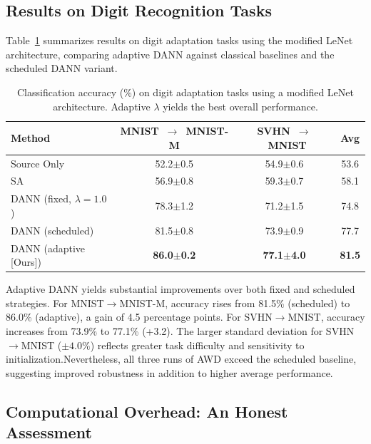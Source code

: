 \documentclass[pdflatex,sn-mathphys-num]{sn-jnl}
\theoremstyle{thmstyleone}
\theoremstyle{thmstyletwo}
\theoremstyle{thmstylethree}
\begin{document}
\subsection{Results on Digit Recognition Tasks}

Table~\ref{tab:digits} summarizes results on digit adaptation tasks using the modified LeNet architecture, comparing adaptive DANN against classical baselines and the scheduled DANN variant.

\begin{table}[t]
    \centering
    \footnotesize 
    \setlength{\tabcolsep}{3.5pt} 
    \caption{Classification accuracy (\%) on digit adaptation tasks using a modified LeNet architecture. Adaptive $\lambda$ yields the best overall performance.}
    \label{tab:digits}
    \begin{tabular}{lccc}
        \toprule
        Method & MNIST~$\to$~MNIST-M & SVHN~$\to$~MNIST & Avg \\
        \midrule
        Source Only & 52.2$\pm$0.5 & 54.9$\pm$0.6 & 53.6 \\
        SA~\cite{fernando2013sa} & 56.9$\pm$0.8 & 59.3$\pm$0.7 & 58.1 \\
        \midrule
        DANN (fixed, $\lambda=1.0$) & 78.3$\pm$1.2 & 71.2$\pm$1.5 & 74.8 \\
        DANN (scheduled)~\cite{ganin2016dann} & 81.5$\pm$0.8 & 73.9$\pm$0.9 & 77.7 \\
        DANN (adaptive [Ours]) & \textbf{86.0$\pm$0.2} & \textbf{77.1$\pm$4.0} & \textbf{81.5} \\
        \bottomrule
    \end{tabular}
\end{table}

Adaptive DANN yields substantial improvements over both fixed and scheduled strategies.
For MNIST$\to$MNIST-M, accuracy rises from 81.5\% (scheduled) to 86.0\% (adaptive), a gain of 4.5 percentage points.
For SVHN$\to$MNIST, accuracy increases from 73.9\% to 77.1\% (+3.2).
The larger standard deviation for SVHN$\to$MNIST ($\pm4.0\%$) reflects greater task difficulty and sensitivity to initialization.Nevertheless, all three runs of AWD exceed the scheduled baseline, suggesting improved robustness in addition to higher average performance.

\subsection{Computational Overhead: An Honest Assessment}
\label{sec:computational_overhead}
\end{document}
